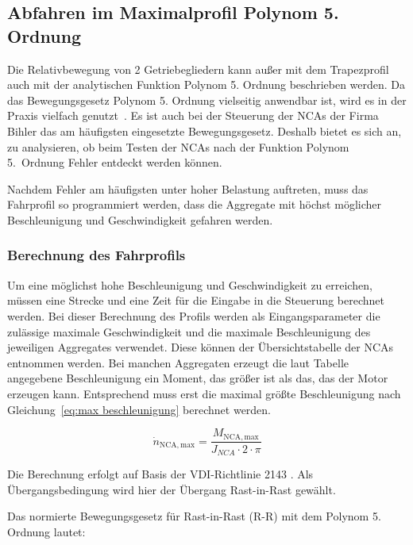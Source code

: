 \subsection{Abfahren im Maximalprofil Polynom 5. Ordnung} \label{cha:Polynom_5_Ordnung}



Die Relativbewegung von 2 Getriebegliedern kann außer mit dem Trapezprofil auch mit der analytischen Funktion Polynom 5. Ordnung beschrieben werden. Da das Bewegungsgesetz Polynom 5. Ordnung vielseitig anwendbar ist, wird es in der Praxis vielfach genutzt~\cite{Braune2009a}. Es ist auch bei der Steuerung der NCAs der Firma Bihler das am häufigsten eingesetzte Bewegungsgesetz. Deshalb bietet es sich an, zu analysieren, ob beim Testen der NCAs nach der Funktion Polynom 5.~Ordnung Fehler entdeckt werden können.

Nachdem Fehler am häufigsten unter hoher Belastung auftreten, muss das Fahrprofil so programmiert werden, dass die Aggregate mit höchst möglicher Beschleunigung und Geschwindigkeit gefahren werden.

\subsubsection{Berechnung des Fahrprofils}

Um eine möglichst hohe Beschleunigung und Geschwindigkeit zu erreichen,  müssen eine Strecke und eine Zeit für die Eingabe in die Steuerung berechnet werden. Bei dieser Berechnung des Profils werden als Eingangsparameter die zulässige maximale Geschwindigkeit und die maximale Beschleunigung des jeweiligen Aggregates verwendet. Diese können der Übersichtstabelle der NCAs \cite{Riedle2015} entnommen werden. Bei manchen Aggregaten erzeugt die laut Tabelle angegebene Beschleunigung ein Moment, das größer ist als das, das der Motor erzeugen kann. Entsprechend muss erst die maximal größte Beschleunigung nach Gleichung~\ref{eq:max beschleunigung} berechnet werden.



\begin{equation}\label{eq:max beschleunigung}
\dot{n}_{\mathrm{NCA, max}} = \frac{M_{\mathrm{NCA, max}}}{J_{NCA} \cdot 2 \cdot \pi}
\end{equation}


Die Berechnung erfolgt auf Basis der VDI-Richtlinie 2143 \cite{VDI2002}. Als Übergangsbedingung wird hier der Übergang Rast-in-Rast gewählt. 

Das normierte Bewegungsgesetz für Rast-in-Rast (R-R) mit dem Polynom 5. Ordnung lautet:

